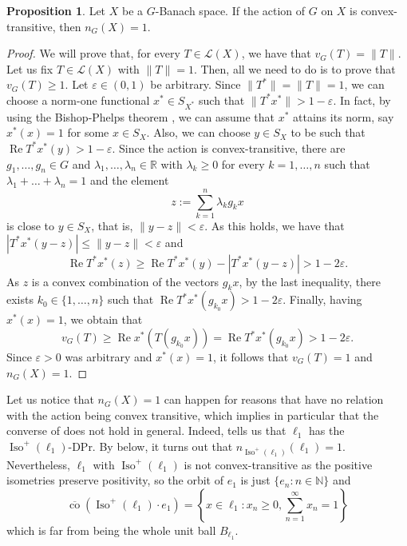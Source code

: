 \documentclass[a4paper,12pt]{amsart}
\theoremstyle{definition}
\newtheorem{proposition}[theorem]{Proposition}
\theoremstyle{definition}
\theoremstyle{remark}
\numberwithin{equation}{section}
\newcommand{\R}{\mathbb{R}}
\newcommand{\N}{\mathbb{N}}
\DeclareMathOperator{\co}{co}
\DeclareMathOperator{\re}{Re}
\DeclareMathOperator{\iso}{Iso}
\renewcommand{\geq}{\geqslant}
\renewcommand{\leq}{\leqslant}
\newcommand{\<}{\langle}
\renewcommand{\>}{\rangle}
\newcommand{\e}{\varepsilon}
\begin{document}
	\begin{proposition} \label{prop:convex-transitivity-G-numerical-index} Let $X$ be a $G$-Banach space. If the action of $G$ on $X$ is convex-transitive, then $n_G(X) = 1$. 
	\end{proposition}
	
	\begin{proof} We will prove that, for every $T \in \mathcal{L}(X)$, we have that $v_G(T) = \|T\|$. Let us fix $T \in \mathcal{L}(X)$ with $\|T\| = 1$. Then, all we need to do is to prove that $v_G(T)  \geq 1$. Let $\e \in (0,1)$ be arbitrary. Since $\|T^*\|=\|T\|=1$, we can choose a norm-one functional $x^* \in S_{X^*}$ such that $\|T^* x^*\| > 1 - \e$. In fact, by using the Bishop-Phelps theorem \cite{BishopPhelps1961}, we can assume that $x^*$ attains its norm, say $x^*(x) = 1$ for some $x \in S_X$. Also, we can choose $y \in S_X$ to be such that $\re T^*x^*(y) > 1 - \e$. Since the action is convex-transitive, there are $g_1, \ldots, g_n \in G$ and $\lambda_1, \ldots, \lambda_n \in \R$ with $\lambda_k \geq 0$ for every $k=1,\ldots,n$ such that $\lambda_1 + \ldots + \lambda_n = 1$ and the element
		\begin{equation*}
			z:= \sum_{k=1}^n \lambda_k g_k x 
		\end{equation*}
		is close to $y \in S_X$, that is, $\|y-z\| < \e$. As this holds, we have that $|T^*x^*(y-z)| \leq \|y-z\| < \e$ and 
		\begin{equation*}
			\re T^* x^*(z) \geq \re T^*x^*(y) - |T^*x^*(y-z)| > 1 -2\e.
		\end{equation*}
		As $z$ is a convex combination of the vectors $g_k x$, by the last inequality, there exists $k_0 \in \{1, \ldots, n\}$ such that $\re T^* x^*(g_{k_0} x) > 1 - 2\e$. Finally, having $x^*(x) = 1$, we obtain that 
		\begin{equation*}
			v_G(T) \geq \re x^*(T(g_{k_0}x)) = \re T^* x^*(g_{k_0} x) > 1 - 2\e.
		\end{equation*}
		Since $\e>0$ was arbitrary and $x^*(x)=1$, it follows that $v_G(T) = 1$ and $n_G(X) = 1$.
	\end{proof}
	
	
	Let us notice that $n_G(X) = 1$ can happen for reasons that have no relation with the action being convex transitive, which implies in particular that the converse of  does not hold in general. Indeed,  tells us that $\ell_1$ has the $\iso^+(\ell_1)$-DPr. By  below, it turns out that $n_{\iso^+(\ell_1)}(\ell_1)=1$. Nevertheless, $\ell_1$ with $\iso^+(\ell_1)$ is not convex-transitive as the positive isometries preserve positivity, so the orbit of $e_1$ is just $\{e_n: n \in \N\}$ and 
	\begin{equation*}
		\overline{\co}(\iso^+(\ell_1) \cdot e_1) = \left\{ x \in \ell_1: x_n \geq 0, \sum_{n=1}^{\infty} x_n = 1 \right\} 
	\end{equation*}
	which is far from being the whole unit ball $B_{\ell_1}$.
	
\end{document}
